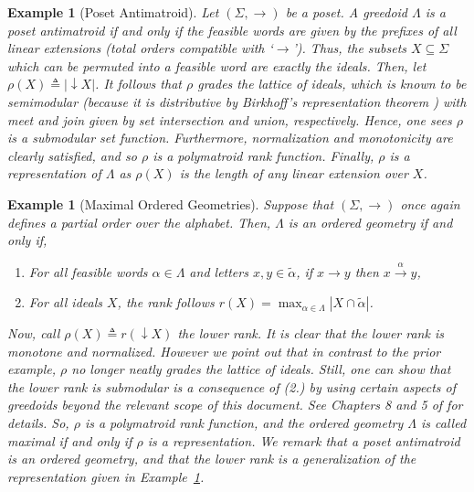 \documentclass[11pt]{article}
\newtheorem{example}[theorem]{Example}
\newcommand{\univ}{\Sigma}
\newcommand{\glang}{\Lambda}
\newcommand{\ideal}[1]{\mathop{\downarrow}#1}
\newcommand{\rank}{r}
\begin{document}
\begin{example}[Poset Antimatroid]\label{ex:poset-antimatroid}
    Let $(\univ, \rightarrow)$ be a poset.
    A greedoid $\glang$ is a \emph{poset antimatroid} if and only if the feasible words are given by the prefixes of all linear extensions (total orders compatible with `$\rightarrow$').
    Thus, the subsets $X \subseteq \univ$ which can be permuted into a feasible word are exactly the ideals.
    Then, let $\rho(X) \triangleq |\ideal X|$.
    It follows that $\rho$ grades the lattice of ideals, which is known to be semimodular (because it is \emph{distributive} by Birkhoff's representation theorem \cite{garg2015introduction}) with meet and join given by set intersection and union, respectively.
    Hence, one sees $\rho$ is a submodular set function.
    Furthermore, normalization and monotonicity are clearly satisfied, and so $\rho$ is a polymatroid rank function.
    Finally, $\rho$ is a representation of $\glang$ as $\rho(X)$ is the length of any linear extension over $X$.
\end{example}

\begin{example}[Maximal Ordered Geometries]\label{ex:ordered-geometry}
    Suppose that $(\univ, \rightarrow)$ once again defines a partial order over the alphabet.
    Then, $\glang$ is an \emph{ordered geometry} if and only if,
    \begin{enumerate}
        \item For all feasible words $\alpha \in \glang$ and letters $x, y \in \widetilde{\alpha}$, if $x \rightarrow y$ then $x \overset{\alpha}{\rightarrow} y$,
        \item For all ideals $X$, the rank follows $\rank(X) = \max_{\alpha \in \glang}|X \cap \widetilde{\alpha}|$.
    \end{enumerate}
    Now, call $\rho(X) \triangleq \rank(\ideal X)$ the \emph{lower rank}.
    It is clear that the lower rank is monotone and normalized.
    However we point out that in contrast to the prior example, $\rho$ no longer neatly grades the lattice of ideals.
    Still, one can show  that the lower rank is submodular is a consequence of (2.) by using certain aspects of greedoids beyond the relevant scope of this document.
    See Chapters 8 and 5 of \cite{korte2012greedoids} for details.
    So, $\rho$ is a polymatroid rank function, and the ordered geometry $\glang$ is called \emph{maximal} if and only if $\rho$ is a representation.
    We remark that a poset antimatroid is an ordered geometry, and that the lower rank is a generalization of the representation given in Example~\ref{ex:poset-antimatroid}.
\end{example}
\fi
\end{document}
